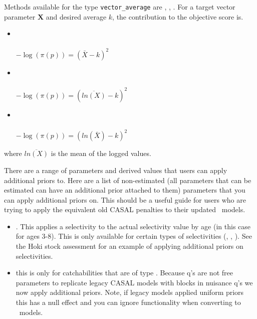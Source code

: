 Methods available for the type \texttt{vector\_average} are , , . For a target vector parameter $\textbf{X}$ and desired average $k$, the contribution to the objective score is.

\begin{itemize}
	\item {}\\\\
	$- \log \left(\pi \left(p \right) \right) = \left(\bar{X} - k\right)^2$
	
	\item {}\\\\
	$- \log \left(\pi \left(p \right) \right) = \left(\overline{ln\left(X\right)} - k\right)^2$
	
	\item {}\\\\
$- \log \left(\pi \left(p \right) \right) = \left(ln\left(\bar{X}\right) - k\right)^2$	
\end{itemize}
where $\overline{ln\left(X\right)}$ is the mean of the logged values.


There are a range of parameters and derived values that users can apply additional priors to. Here are a list of non-estimated (all parameters that can be estimated can have an additional prior attached to them) parameters that you can apply additional priors on. This should be a useful guide for users who are trying to apply the equivalent old CASAL penalties to their updated \CNAME\ models.

\begin{itemize}
	\item {}. This applies a selectivity to the actual selectivity value by age (in this case for ages 3-8). This is only available for certain types of selectivities (, , ). See the Hoki stock assessment for an example of applying additional priors on selectivities.
	\item {}
	this is only for catchabilities that are of type . Because  q's are not free parameters to replicate legacy CASAL models with  blocks in nuisance q's we now apply additional priors. Note, if legacy models applied uniform priors this has a null effect and you can ignore functionality when converting to \CNAME\ models.
\end{itemize}
\pagebreak
